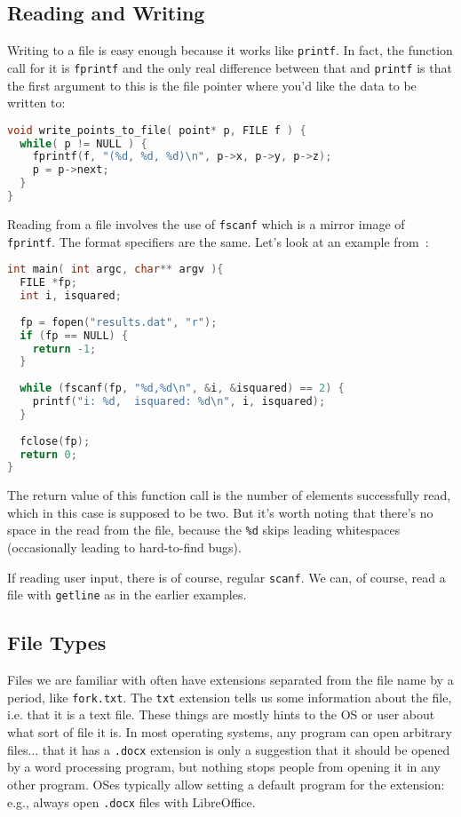 \subsection*{Reading and Writing}

Writing to a file is easy enough because it works like \texttt{printf}. In fact, the function call for it is \texttt{fprintf} and the only real difference between that and \texttt{printf} is that the first argument to this is the file pointer where you'd like the data to be written to:

\begin{lstlisting}[language=C]
void write_points_to_file( point* p, FILE f ) {
  while( p != NULL ) {
    fprintf(f, "(%d, %d, %d)\n", p->x, p->y, p->z);
    p = p->next;
  }
}
\end{lstlisting}

Reading from a file involves the use of \texttt{fscanf} which is a mirror image of \texttt{fprintf}. The format specifiers are the same. Let's look at an example from~\cite{cfiles}:

\begin{lstlisting}[language=C]
int main( int argc, char** argv ){
  FILE *fp;
  int i, isquared;
   
  fp = fopen("results.dat", "r");
  if (fp == NULL) {
    return -1;
  }
   
  while (fscanf(fp, "%d,%d\n", &i, &isquared) == 2) {
    printf("i: %d,  isquared: %d\n", i, isquared);
  }
  
  fclose(fp);
  return 0;
}
\end{lstlisting}

The return value of this function call is the number of elements successfully read, which in this case is supposed to be two. But it's worth noting that there's no space in the read from the file, because the \texttt{\%d} skips leading whitespaces (occasionally leading to hard-to-find bugs).

If reading user input, there is of course, regular \texttt{scanf}. We can, of course, read a file with \texttt{getline} as in the earlier examples.

\subsection*{File Types}

Files we are familiar with often have extensions separated from the file name by a period, like \texttt{fork.txt}. The \texttt{txt} extension tells us some information about the file, i.e. that it is a text file. These things are mostly hints to the OS or user about what sort of file it is. In most operating systems, any program can open arbitrary files... that it has a \texttt{.docx} extension is only a suggestion that it should be opened by a word processing program, but nothing stops people from opening it in any other program. OSes typically allow setting a default program for the extension: e.g., always open \texttt{.docx} files with LibreOffice.

